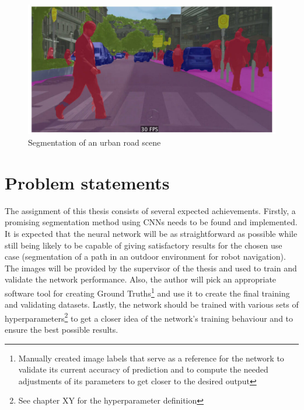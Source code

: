 \vspace{5mm}
\begin{figure}[htb]
	\begin{center}
		\includegraphics*[width=13cm, keepaspectratio]{obr/semseg.jpg}
	\end{center}
	\caption{Segmentation of an urban road scene} %
	\label{cocka}
\end{figure}

\chapter{Problem statements}
The assignment of this thesis consists of several expected achievements. Firstly, a promising segmentation method using CNNs needs to be found and implemented. It is expected that the neural network will be as straightforward as possible while still being likely to be capable of giving satisfactory results for the chosen use case (segmentation of a path in an outdoor environment for robot navigation). The images will be provided by the supervisor of the thesis and used to train and validate the network performance. Also, the author will pick an appropriate software tool for creating Ground Truths\footnote{Manually created image labels that serve as a reference for the network to validate its current accuracy of prediction and to compute the needed adjustments of its parameters to get closer to the desired output} and use it to create the final training and validating datasets. Lastly, the network should be trained with various sets of hyperparameters\footnote{See chapter XY for the hyperparameter definition} to get a closer idea of the network's training behaviour and to ensure the best possible results. 

